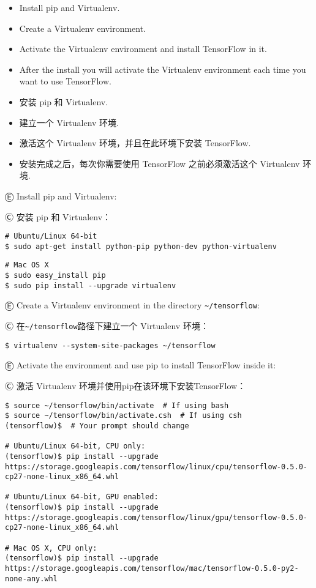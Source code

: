 \begin{itemize}
\item \textcolor{etc}{Install pip and Virtualenv.}
\item \textcolor{etc}{Create a Virtualenv environment.}
\item \textcolor{etc}{Activate the Virtualenv environment and install TensorFlow in it.}
\item \textcolor{etc}{After the install you will activate the Virtualenv environment each time you want to use TensorFlow.}
\item 安装 pip 和 Virtualenv.
\item 建立一个 Virtualenv 环境.
\item 激活这个 Virtualenv 环境，并且在此环境下安装 TensorFlow.
\item 安装完成之后，每次你需要使用 TensorFlow 之前必须激活这个 Virtualenv 环境.
\end{itemize}

Ⓔ \textcolor{etc}{Install pip and Virtualenv:}

Ⓒ 安装 pip 和 Virtualenv：

\begin{lstlisting}
# Ubuntu/Linux 64-bit
$ sudo apt-get install python-pip python-dev python-virtualenv
\end{lstlisting}

\begin{lstlisting}
# Mac OS X
$ sudo easy_install pip
$ sudo pip install --upgrade virtualenv
\end{lstlisting}

Ⓔ \textcolor{etc}{Create a Virtualenv environment in the directory} \lstinline{~/tensorflow}:

Ⓒ 在\lstinline{~/tensorflow}路径下建立一个 Virtualenv 环境：

\begin{lstlisting}
$ virtualenv --system-site-packages ~/tensorflow
\end{lstlisting}

Ⓔ \textcolor{etc}{Activate the environment and use pip to install TensorFlow inside it:}

Ⓒ 激活 Virtualenv 环境并使用pip在该环境下安装TensorFlow：

\begin{lstlisting}
$ source ~/tensorflow/bin/activate  # If using bash
$ source ~/tensorflow/bin/activate.csh  # If using csh
(tensorflow)$  # Your prompt should change

# Ubuntu/Linux 64-bit, CPU only:
(tensorflow)$ pip install --upgrade https://storage.googleapis.com/tensorflow/linux/cpu/tensorflow-0.5.0-cp27-none-linux_x86_64.whl

# Ubuntu/Linux 64-bit, GPU enabled:
(tensorflow)$ pip install --upgrade https://storage.googleapis.com/tensorflow/linux/gpu/tensorflow-0.5.0-cp27-none-linux_x86_64.whl

# Mac OS X, CPU only:
(tensorflow)$ pip install --upgrade https://storage.googleapis.com/tensorflow/mac/tensorflow-0.5.0-py2-none-any.whl
\end{lstlisting}

